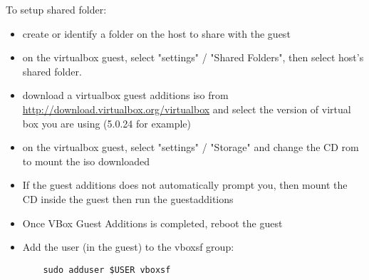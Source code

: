 \documentclass{article}
\begin{document}
To setup shared folder:
\begin{itemize}
\item create or identify a folder on the host to share with the guest
\item on the virtualbox guest, select "settings" / "Shared Folders",
then select host's shared folder.

\item download a virtualbox guest additions iso from 
\url{http://download.virtualbox.org/virtualbox} and select
the version of virtual box you are using (5.0.24 for example)

\item on the virtualbox guest, select "settings" / "Storage" and
change the CD rom to mount the iso downloaded

\item If the guest additions does not automatically prompt you, then mount the CD 
inside the guest then run the guestadditions

\item Once VBox Guest Additions is completed, reboot the guest

\item Add the user (in the guest) to the vboxsf group:
\begin{verbatim}
    sudo adduser $USER vboxsf
\end{verbatim}
\end{itemize}
\end{document}

